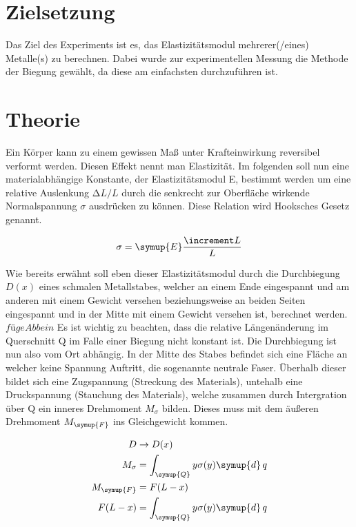 \section{Zielsetzung}
\label{sec:Zielsetzung}

Das Ziel des Experiments ist es, das Elastizitätsmodul mehrerer(/eines) Metalle(s) zu berechnen.
Dabei wurde zur experimentellen Messung die Methode der Biegung gewählt, da diese am einfachsten durchzuführen ist.

\section{Theorie}
\label{sec:Theorie}

Ein Körper kann zu einem gewissen Maß unter Krafteinwirkung reversibel
verformt werden. Diesen Effekt nennt man Elastizität. Im folgenden soll nun
eine materialabhängige Konstante, der Elastizitätsmodul E, bestimmt werden
um eine relative Auslenkung $\increment L/L$ durch die senkrecht zur Oberfläche
wirkende Normalspannung $\sigma$ ausdrücken zu können. Diese Relation wird
Hooksches Gesetz genannt.

\begin{equation}
  \sigma = \symup{E}\frac{\increment L}{L}
\end{equation}

Wie bereits erwähnt soll eben dieser Elastizitätsmodul durch die
Durchbiegung $D(x)$ eines schmalen Metallstabes, welcher an
einem Ende eingespannt und am anderen mit einem Gewicht versehen
beziehungsweise an beiden Seiten eingespannt und in der Mitte
mit einem Gewicht versehen ist, berechnet werden.
$füge Abb ein$
Es ist wichtig zu beachten, dass die relative Längenänderung im Querschnitt
Q im Falle einer Biegung nicht konstant ist. Die Durchbiegung ist nun also
vom Ort abhängig. In der Mitte des Stabes befindet sich eine Fläche an welcher
keine Spannung Auftritt, die sogenannte neutrale Faser. Überhalb dieser
bildet sich eine Zugspannung (Streckung des Materials), untehalb eine Druckspannung
(Stauchung des Materials), welche zusammen durch Intergration über Q ein inneres Drehmoment $M_\sigma$ bilden.
Dieses muss mit dem äußeren Drehmoment $M_\symup{F}$ ins Gleichgewicht kommen.

\begin{align}
  D &\to D(x)\\
  M_\sigma &= \int_\symup{Q} y \sigma(y) \symup{d} \, q\\
  M_\symup{F} &= F(L-x)\\
  F(L-x) &= \int_\symup{Q} y \sigma(y) \symup{d} \, q
\end{align}




\cite{litval}
